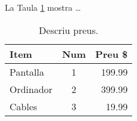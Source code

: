 \documentclass{article}
\begin{document}
La Taula \ref{taula:items} mostra \dots

\begin{table}
    \centering
    \begin{tabular}{lcr}
        \toprule
        Item      & Num & Preu \$ \\
        \midrule
        Pantalla  & 1 & 199.99 \\
        Ordinador & 2 & 399.99 \\
        Cables    & 3 & 19.99 \\
        \bottomrule
    \end{tabular}
    \caption{Descriu preus.}
    \label{taula:items}
\end{table}
\end{document}
